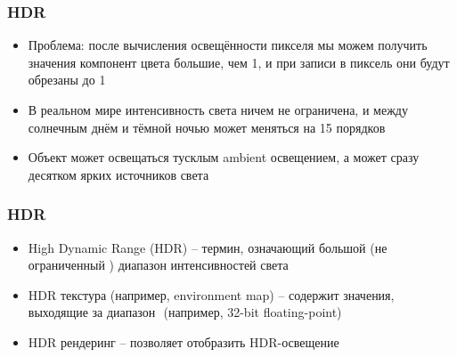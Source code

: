 \documentclass[10pt]{beamer}
\begin{document}
\begin{frame}[fragile]
\frametitle{HDR}
\begin{itemize}
\item Проблема: после вычисления освещённости пикселя мы можем получить значения компонент цвета большие, чем 1, и при записи в пиксель они будут обрезаны до 1
\pause
\item В реальном мире интенсивность света ничем не ограничена, и между солнечным днём и тёмной ночью может меняться на 15 порядков
\pause
\item Объект может освещаться тусклым ambient освещением, а может сразу десятком ярких источников света
\end{itemize}
\end{frame}

\begin{frame}[fragile]
\frametitle{HDR}
\begin{itemize}
\item High Dynamic Range (HDR) -- термин, означающий большой (не ограниченный \begin{math}[0, 1]\end{math}) диапазон интенсивностей света
\pause
\item HDR текстура (например, environment map) -- содержит значения, выходящие за диапазон \begin{math}[0, 1]\end{math} (например, 32-bit floating-point)
\pause
\item HDR рендеринг -- позволяет отобразить HDR-освещение
\end{itemize}
\end{frame}
\end{document}
